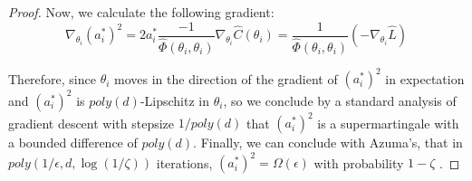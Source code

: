 \documentclass{article}
\newcommand{\Authornote}[2]{{\sf\color{red}{[#1: #2]}}}
\newcommand{\Authornote}[2]{}
\newcommand{\Snote}{\Authornote{S}}
\begin{document}
\begin{proof}
Now, we calculate the following gradient: 
%
\begin{equation}
\nabla_{\theta_i} (a_i^*)^2 = 2a_i^*\frac{-1}{\widehat{\Phi}(\theta_i,\theta_i)} \nabla_{\theta_i} \widehat{C}(\theta_i) = \frac{1}{\widehat{\Phi}(\theta_i,\theta_i)} (-\nabla_{\theta_i} \widehat{L})
\end{equation}

Therefore, since $\theta_i$ moves in the direction of the gradient of $(a_i^*)^2$ in expectation and $(a_i^*)^2$ is $poly(d)$-Lipschitz in $\theta_i$, so we conclude by a standard analysis of gradient descent with stepsize $1/poly(d)$ that $(a_i^*)^2$ is a supermartingale with a bounded difference of $poly(d)$. Finally, we can conclude with Azuma's, that in $poly(1/\epsilon,d,\log(1/\zeta))$ iterations, $(a_i^*)^2 = \Omega(\epsilon)$ with probability $1-\zeta$ .
\Snote{The last part was too fast. Can you please elaborate what do you mean by ‘moves in the same direction of the gradient of ..’? Also, what analysis of SGD are you using, please cite a theorem and plug it in here? I don’t know how do supermartingale bounds applies to SGD.}
\end{proof}
\end{document}
